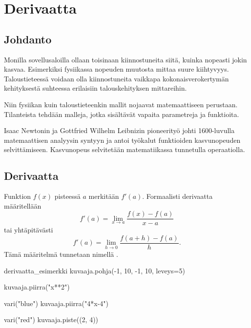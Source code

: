 \chapter{Derivaatta}


\section{Johdanto}

Monilla sovellusaloilla ollaan toisinaan kiinnostuneita siitä, kuinka nopeasti jokin kasvaa.
Esimerkiksi fysiikassa nopeuden muutosta mittaa suure kiihtyvyys. Taloustieteessä voidaan olla
kiinnostuneita vaikkapa kokonaisverokertymän kehityksestä suhteessa erilaisiin talouskehityksen mittareihin.

Niin fysiikan kuin taloustieteenkin mallit nojaavat matemaattiseen perustaan.
Tilanteista tehdään malleja, jotka sisältävät vapaita parametreja ja funktioita.

Isaac Newtonin ja Gottfried Wilhelm Leibnizin pioneerityö johti 1600-luvulla
matemaattisen analyysin syntyyn ja antoi työkalut funktioiden kasvunopeuden selvittämiseen.
Kasvunopeus selvitetään matematiikassa  tunnetulla operaatiolla.

\section{Derivaatta}

Funktion $f(x)$  pisteessä $a$ merkitään $f'(a)$.
Formaalisti derivaatta määritellään
\[ f'(a) = \lim\limits_{x \to a} \frac{f(x)-f(a)}{x-a} \]
tai yhtäpitävästi
\[ f'(a) = \lim\limits_{h \to 0} \frac{f(a+h)-f(a)}{h}. \]
Tämä määritelmä tunnetaan nimellä .

\begin{luoKuva}{derivaatta_esimerkki}
    kuvaaja.pohja(-1, 10, -1, 10, leveys=5)
    
    kuvaaja.piirra("x**2")
    
    vari("blue")
    kuvaaja.piirra("4*x-4")
   
    vari("red")
    kuvaaja.piste((2, 4))
\end{luoKuva}

